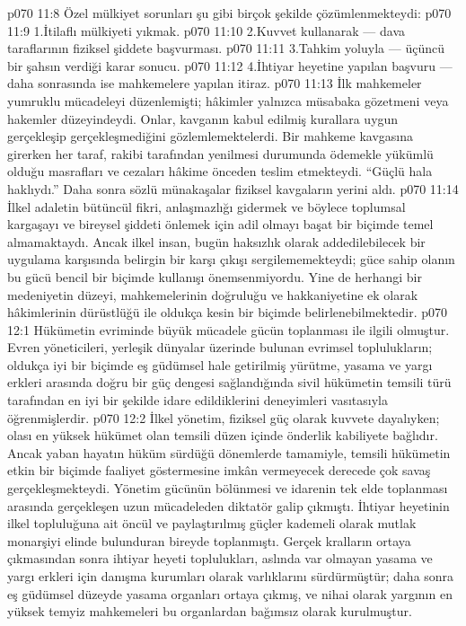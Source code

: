 \vs p070 11:8 Özel mülkiyet sorunları şu gibi birçok şekilde çözümlenmekteydi:
\vs p070 11:9 1.\bibnobreakspace İtilaflı mülkiyeti yıkmak.
\vs p070 11:10 2.\bibnobreakspace Kuvvet kullanarak --- dava taraflarının fiziksel şiddete başvurması.
\vs p070 11:11 3.\bibnobreakspace Tahkim yoluyla --- üçüncü bir şahsın verdiği karar sonucu.
\vs p070 11:12 4.\bibnobreakspace İhtiyar heyetine yapılan başvuru --- daha sonrasında ise mahkemelere yapılan itiraz.
\vs p070 11:13 İlk mahkemeler yumruklu mücadeleyi düzenlemişti; hâkimler yalnızca müsabaka gözetmeni veya hakemler düzeyindeydi. Onlar, kavganın kabul edilmiş kurallara uygun gerçekleşip gerçekleşmediğini gözlemlemektelerdi. Bir mahkeme kavgasına girerken her taraf, rakibi tarafından yenilmesi durumunda ödemekle yükümlü olduğu masrafları ve cezaları hâkime önceden teslim etmekteydi. “Güçlü hala haklıydı.” Daha sonra sözlü münakaşalar fiziksel kavgaların yerini aldı.
\vs p070 11:14 İlkel adaletin bütüncül fikri, anlaşmazlığı gidermek ve böylece toplumsal kargaşayı ve bireysel şiddeti önlemek için adil olmayı başat bir biçimde temel almamaktaydı. Ancak ilkel insan, bugün haksızlık olarak addedilebilecek bir uygulama karşısında belirgin bir karşı çıkışı sergilememekteydi; güce sahip olanın bu gücü bencil bir biçimde kullanışı önemsenmiyordu. Yine de herhangi bir medeniyetin düzeyi, mahkemelerinin doğruluğu ve hakkaniyetine ek olarak hâkimlerinin dürüstlüğü ile oldukça kesin bir biçimde belirlenebilmektedir.
\vs p070 12:1 Hükümetin evriminde büyük mücadele gücün toplanması ile ilgili olmuştur. Evren yöneticileri, yerleşik dünyalar üzerinde bulunan evrimsel toplulukların; oldukça iyi bir biçimde eş güdümsel hale getirilmiş yürütme, yasama ve yargı erkleri arasında doğru bir güç dengesi sağlandığında sivil hükümetin temsili türü tarafından en iyi bir şekilde idare edildiklerini deneyimleri vasıtasıyla öğrenmişlerdir.
\vs p070 12:2 İlkel yönetim, fiziksel güç olarak kuvvete dayalıyken; olası en yüksek hükümet olan temsili düzen içinde önderlik kabiliyete bağlıdır. Ancak yaban hayatın hüküm sürdüğü dönemlerde tamamiyle, temsili hükümetin etkin bir biçimde faaliyet göstermesine imkân vermeyecek derecede çok savaş gerçekleşmekteydi. Yönetim gücünün bölünmesi ve idarenin tek elde toplanması arasında gerçekleşen uzun mücadeleden diktatör galip çıkmıştı. İhtiyar heyetinin ilkel topluluğuna ait öncül ve paylaştırılmış güçler kademeli olarak mutlak monarşiyi elinde bulunduran bireyde toplanmıştı. Gerçek kralların ortaya çıkmasından sonra ihtiyar heyeti toplulukları, aslında var olmayan yasama ve yargı erkleri için danışma kurumları olarak varlıklarını sürdürmüştür; daha sonra eş güdümsel düzeyde yasama organları ortaya çıkmış, ve nihai olarak yargının en yüksek temyiz mahkemeleri bu organlardan bağımsız olarak kurulmuştur.
